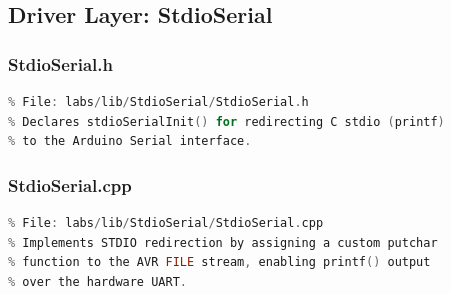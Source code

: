 \subsection{Driver Layer: StdioSerial}

\subsubsection{StdioSerial.h}
\begin{lstlisting}[language=C++, caption=StdioSerial.h --- STDIO Serial Redirect Interface, label=lst:appendix_stdio_serial_h]
% [Full source code - see GitHub repository]
% File: labs/lib/StdioSerial/StdioSerial.h
% Declares stdioSerialInit() for redirecting C stdio (printf)
% to the Arduino Serial interface.
\end{lstlisting}

\subsubsection{StdioSerial.cpp}
\begin{lstlisting}[language=C++, caption=StdioSerial.cpp --- STDIO Serial Redirect Implementation, label=lst:appendix_stdio_serial_cpp]
% [Full source code - see GitHub repository]
% File: labs/lib/StdioSerial/StdioSerial.cpp
% Implements STDIO redirection by assigning a custom putchar
% function to the AVR FILE stream, enabling printf() output
% over the hardware UART.
\end{lstlisting}
